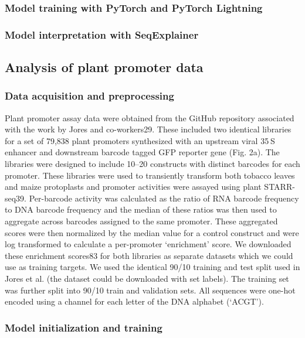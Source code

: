 \subsubsection{Model training with PyTorch and PyTorch Lightning}

\subsubsection{Model interpretation with SeqExplainer}

\subsection{Analysis of plant promoter data}

\subsubsection{Data acquisition and preprocessing}

Plant promoter assay data were obtained from the GitHub repository associated with the work by Jores and co-workers29. These included two identical libraries for a set of 79,838 plant promoters synthesized with an upstream viral 35 S enhancer and downstream barcode tagged GFP reporter gene (Fig. 2a). The libraries were designed to include 10–20 constructs with distinct barcodes for each promoter. These libraries were used to transiently transform both tobacco leaves and maize protoplasts and promoter activities were assayed using plant STARR-seq39. Per-barcode activity was calculated as the ratio of RNA barcode frequency to DNA barcode frequency and the median of these ratios was then used to aggregate across barcodes assigned to the same promoter. These aggregated scores were then normalized by the median value for a control construct and were log transformed to calculate a per-promoter ‘enrichment’ score. We downloaded these enrichment scores83 for both libraries as separate datasets which we could use as training targets. We used the identical 90/10 training and test split used in Jores et al. (the dataset could be downloaded with set labels). The training set was further split into 90/10 train and validation sets. All sequences were one-hot encoded using a channel for each letter of the DNA alphabet (‘ACGT’).

\subsubsection{Model initialization and training}


